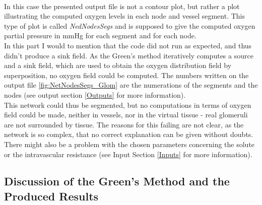 \\In this case the presented output file is not a contour plot, but rather a plot illustrating the computed oxygen levels in each node and vessel segment. This type of plot is called \emph{NedNodesSegs} and is supposed to give the computed oxygen partial pressure in mmHg for each segment and for each node.
\\In this part I would to mention that the code did not run as expected, and thus didn't produce a sink field. As the Green's method iteratively computes a source and a sink field, which are used to obtain the oxygen distribution field by superposition, no oxygen field could be computed. The numbers written on the output file \ref{fig:NetNodesSegs_Glom} are the numerations of the segments and the nodes (see output section \ref{Outputs} for more information).
\\This network could thus be segmented, but no computations in terms of oxygen field could be made, neither in vessels, nor in the virtual tissue - real glomeruli are not surrounded by tissue. The reasons for this failing are not clear, as the network is so complex, that no correct explanation can be given without doubts. There might also be a problem with the chosen parameters concerning the solute or the intravascular resistance (see Input Section \ref{Inputs} for more information).

\newpage
\subsection{Discussion of the Green's Method and the Produced Results}

